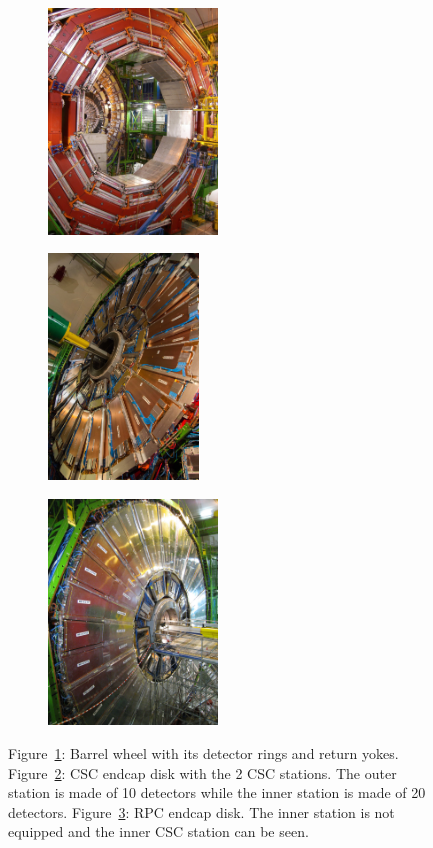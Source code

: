	\begin{figure}[H]
		\begin{subfigure}{0.35\linewidth}
			\centering
			\includegraphics[height = 6cm]{fig/chapt2/Wheel.jpg}
			\caption{\label{fig:Muon:A}}
		\end{subfigure}
		\begin{subfigure}{0.3\linewidth}
			\centering
			\includegraphics[height = 6cm]{fig/chapt2/Disk_CSC.jpg}
			\caption{\label{fig:Muon:B}}
		\end{subfigure}
		\begin{subfigure}{0.35\linewidth}
			\centering
			\includegraphics[height = 6cm]{fig/chapt2/Disk_RPC.jpg}
			\caption{\label{fig:Muon:C}}
		\end{subfigure}
		\caption{\label{fig:Muon} Figure~\ref{fig:Muon:A}: Barrel wheel with its detector rings and return yokes. Figure~\ref{fig:Muon:B}: CSC endcap disk with the 2 CSC stations. The outer station is made of \SI{10}{\deg} detectors while the inner station is made of \SI{20}{\deg} detectors. Figure~\ref{fig:Muon:C}: RPC endcap disk. The inner station is not equipped and the inner CSC station can be seen.}
	\end{figure}
	

